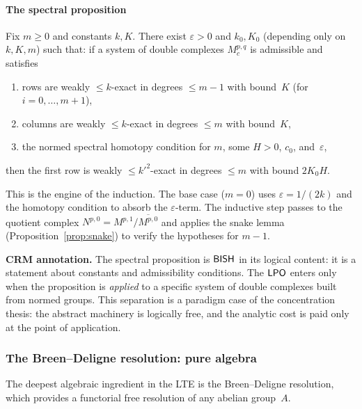 \paragraph{The spectral proposition}

\begin{proposition}
\label{prop:spectral}
Fix $m \geq 0$ and constants $k, K$.  There exist $\varepsilon > 0$
and $k_0, K_0$ (depending only on $k, K, m$) such that: if
a system of double complexes $M^{p,q}_c$ is admissible and satisfies
\begin{enumerate}[nosep,label=(\roman*)]
\item rows are weakly $\leq k$-exact in degrees $\leq m-1$ with
  bound~$K$ (for $i = 0, \ldots, m+1$),
\item columns are weakly $\leq k$-exact in degrees $\leq m$ with
  bound~$K$,
\item the normed spectral homotopy condition for $m$, some $H > 0$,
  $c_0$, and~$\varepsilon$,
\end{enumerate}
then the first row is weakly $\leq k'^2$-exact in degrees $\leq m$
with bound $2K_0 H$.
\end{proposition}

\noindent This is the engine of the induction.  The base case ($m=0$)
uses $\varepsilon = 1/(2k)$ and the homotopy condition to absorb the
$\varepsilon$-term.  The inductive step passes to the quotient complex
$N^{p,0} = M^{p,1}/\overline{M^{p,0}}$ and applies the snake lemma
(Proposition~\ref{prop:snake}) to verify the hypotheses for $m-1$.

\medskip
\noindent\textbf{CRM annotation.}
The spectral proposition is $\textsf{BISH}$ in its logical content: it is a
statement about constants and admissibility conditions.  The $\textsf{LPO}$
enters only when the proposition is \emph{applied} to a specific
system of double complexes built from normed groups.  This separation
is a paradigm case of the concentration thesis: the abstract machinery
is logically free, and the analytic cost is paid only at the
point of application.


\subsubsection{The Breen--Deligne resolution: pure algebra}\label{sec:BD}

The deepest algebraic ingredient in the LTE is the Breen--Deligne
resolution, which provides a functorial free resolution of any
abelian group~$A$.

